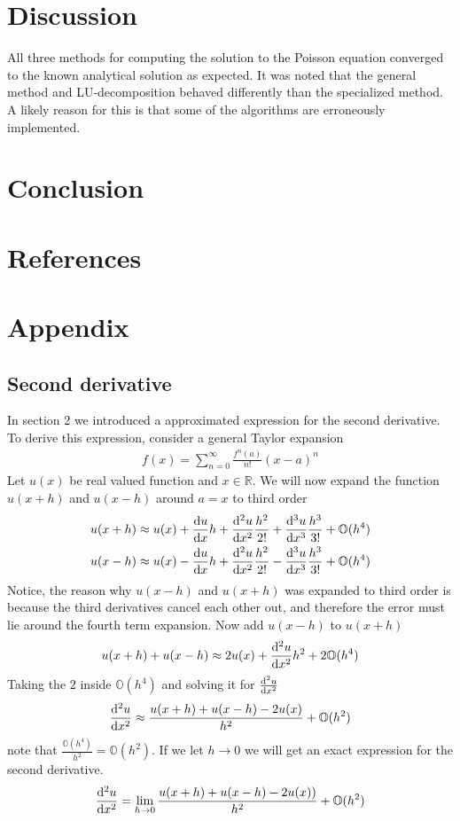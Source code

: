 \documentclass[aps,prl,reprint,toc]{revtex4-1}
\begin{document}
\section{Discussion}
\label{sec:discusison}

All three methods for computing the solution to the Poisson equation converged
to the known analytical solution as expected. It was noted that the general
method and LU-decomposition behaved differently than the specialized method. A
likely reason for this is that some of the algorithms are erroneously
implemented.



\section{Conclusion}

\section{References}

\newpage
\appendix
\section{Appendix}
\subsection{Second derivative}
In section 2 we introduced a approximated expression for the second derivative. To derive this expression, consider a general Taylor expansion
\begin{align*}
f(x) = \sum_{n = 0}^{\infty}\frac{f^{n}(a)}{n!}(x-a)^{n}
\end{align*}
Let $u(x)$ be real valued function and $x\in \mathbb{R}$. We will now expand the function $u(x+h)$ and $u(x-h)$ around $a = x$
to third order
\begin{align*}
u(x+h) \approx u(x)  + \dv{u}{x}h + \dv[2]{u}{x}\frac{h^2}{2!} + \dv[3]{u}{x}\frac{h^3}{3!} + \mathbb{O}(h^4)
\\
u(x-h) \approx u(x) - \dv{u}{x}h + \dv[2]{u}{x}\frac{h^2}{2!} - \dv[3]{u}{x}\frac{h^3}{3!} + \mathbb{O}(h^4)
\end{align*}
Notice, the reason why $u(x-h)$ and $u(x+h)$ was expanded to third order is because the third derivatives cancel each other out, and therefore the error must lie around the fourth term expansion. Now add $u(x-h)$ to $u(x+h)$
\begin{align*}
u(x+h) + u(x-h) \approx 2u(x) + \dv[2]{u}{x}h^2 + 2\mathbb{O}(h^4)
\end{align*}
Taking the $2$ inside $\mathbb{O}(h^4)$ and solving it for $\dv[2]{u}{x}$
\begin{align*}
\dv[2]{u}{x} \approx \frac{u(x+h) + u(x-h) - 2u(x)}{h^2} + \mathbb{O}(h^2)
\end{align*}
note that $\frac{\mathbb{O}(h^4)}{h^2} = \mathbb{O}(h^2)$. If we let \(h \to 0\)
we will get an exact expression for the second derivative.
\begin{align*}
  \dv[2]{u}{x} = \lim_{h \to 0} \frac{u(x+h) + u(x-h) - 2u(x))}{h^{2}} + \mathbb{O}(h^{2})
\end{align*}
\end{document}
